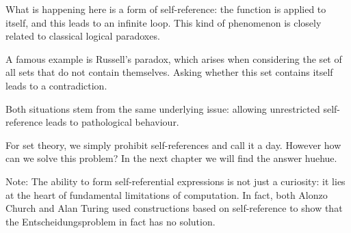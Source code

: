 What is happening here is a form of self-reference: the function is applied to itself, and this leads to an infinite loop. This kind of phenomenon is closely related to classical logical paradoxes.

A famous example is Russell's paradox, which arises when considering the set of all sets that do not contain themselves. Asking whether this set contains itself leads to a contradiction.

Both situations stem from the same underlying issue: allowing unrestricted self-reference leads to pathological behaviour.

For set theory, we simply prohibit self-references and call it a day. However how can we solve this problem? In the next chapter we will find the answer huehue.

Note: The ability to form self-referential expressions is not just a curiosity: it lies at the heart of fundamental limitations of computation. In fact, both Alonzo Church and Alan Turing used constructions based on self-reference to show that the Entscheidungsproblem in fact has no solution.